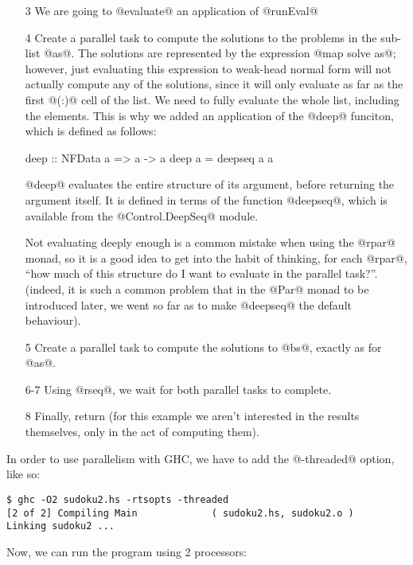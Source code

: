 \begin{itemize}
\item[3] We are going to @evaluate@ an application of @runEval@
\item[4] Create a parallel task to compute the solutions to the
  problems in the sub-list @as@.  The solutions are represented by the
  expression @map solve as@; however, just evaluating this expression
  to weak-head normal form will not actually compute any of the
  solutions, since it will only evaluate as far as the first @(:)@
  cell of the list.  We need to fully evaluate the whole list,
  including the elements.  This is why we added an application of the
  @deep@ funciton, which is defined as follows:

\begin{haskell}
deep :: NFData a => a -> a
deep a = deepseq a a
\end{haskell}
\noindent @deep@ evaluates the entire structure of its argument,
before returning the argument itself.  It is defined in terms of the
function @deepseq@, which is available from the @Control.DeepSeq@
module.

  Not evaluating deeply enough is a common mistake when using the
  @rpar@ monad, so it is a good idea to get into the habit of
  thinking, for each @rpar@, ``how much of this structure do I want to
  evaluate in the parallel task?''. (indeed, it is such a common
  problem that in the @Par@ monad to be introduced later, we went so
  far as to make @deepseq@ the default behaviour).

\item[5] Create a parallel task to compute the solutions to @bs@,
  exactly as for @as@.
\item[6-7] Using @rseq@, we wait for both parallel tasks to complete.
\item[8] Finally, return (for this example we aren't interested in the
  results themselves, only in the act of computing them).
\end{itemize}

In order to use parallelism with GHC, we have to add the @-threaded@
option, like so:

{\small \begin{verbatim}
$ ghc -O2 sudoku2.hs -rtsopts -threaded
[2 of 2] Compiling Main             ( sudoku2.hs, sudoku2.o )
Linking sudoku2 ...
\end{verbatim}}

\noindent Now, we can run the program using 2 processors:

